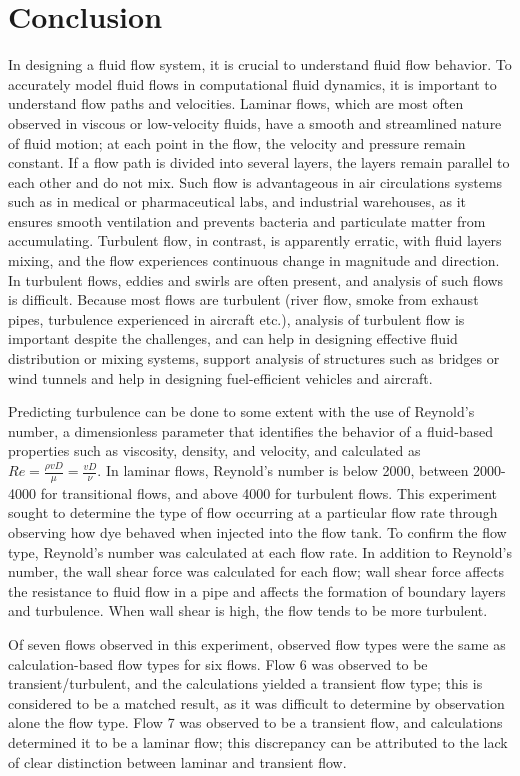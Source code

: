 \documentclass{article}
\begin{document}
\section{Conclusion}
\par In designing a fluid flow system, it is crucial to understand fluid flow behavior. To accurately model fluid flows in computational fluid dynamics, it is important to understand flow paths and velocities. Laminar flows, which are most often observed in viscous or low-velocity fluids, have a smooth and streamlined nature of fluid motion; at each point in the flow, the velocity and pressure remain constant. If a flow path is divided into several layers, the layers remain parallel to each other and do not mix. Such flow is advantageous in air circulations systems such as in medical or pharmaceutical labs, and industrial warehouses, as it ensures smooth ventilation and prevents bacteria and particulate matter from accumulating. Turbulent flow, in contrast, is apparently erratic, with fluid layers mixing, and the flow experiences continuous change in magnitude and direction. In turbulent flows, eddies and swirls are often present, and analysis of such flows is difficult. Because most flows are turbulent (river flow, smoke from exhaust pipes, turbulence experienced in aircraft etc.), analysis of turbulent flow is important despite the challenges, and can help in designing effective fluid distribution or mixing systems, support analysis of structures such as bridges or wind tunnels and help in designing fuel-efficient vehicles and aircraft. 
\par Predicting turbulence can be done to some extent with the use of Reynold's number, a dimensionless parameter that identifies the behavior of a fluid-based properties such as viscosity, density, and velocity, and calculated as $Re=\frac{\rho vD}{\mu}=\frac{vD}{\nu}$. In laminar flows, Reynold's number is below 2000, between 2000-4000 for transitional flows, and above 4000 for turbulent flows. This experiment sought to determine the type of flow occurring at a particular flow rate through observing how dye behaved when injected into the flow tank. To confirm the flow type, Reynold's number was calculated at each flow rate. In addition to Reynold's number, the wall shear force was calculated for each flow; wall shear force affects the resistance to fluid flow in a pipe and affects the formation of boundary layers and turbulence. When wall shear is high, the flow tends to be more turbulent. 
\par Of seven flows observed in this experiment, observed flow types were the same as calculation-based flow types for six flows.  Flow 6 was observed to be transient/turbulent, and the calculations yielded a transient flow type; this is considered to be a matched result, as it was difficult to determine by observation alone the flow type. Flow 7 was observed to be a transient flow, and calculations determined it to be a laminar flow; this discrepancy can be attributed to the lack of clear distinction between laminar and transient flow. 
\end{document}
